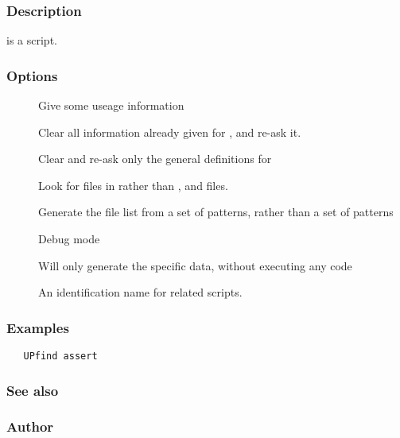 \begin{synopsis}
\end{synopsis}

\subsubsection*{Description}

 is a script.

\subsubsection*{Options}

\begin{description}
\item[]
    Give some useage information
\item[]
    Clear all information already given for , and re-ask it.
\item[]
    Clear and re-ask only the general definitions for 
\item[]
    Look for files in  rather than ,  and
     files.
\item[]
    Generate the file list from a set of  patterns, rather than a set of
     patterns
\item[]
    Debug mode
\item[]
    Will only generate the specific data, without executing any code
\item[]
    An identification name for related  scripts.
\end{description}

\subsubsection*{Examples}

\begin{verbatim}
   UPfind assert
\end{verbatim}

\subsubsection*{See also}

\subsubsection*{Author}

